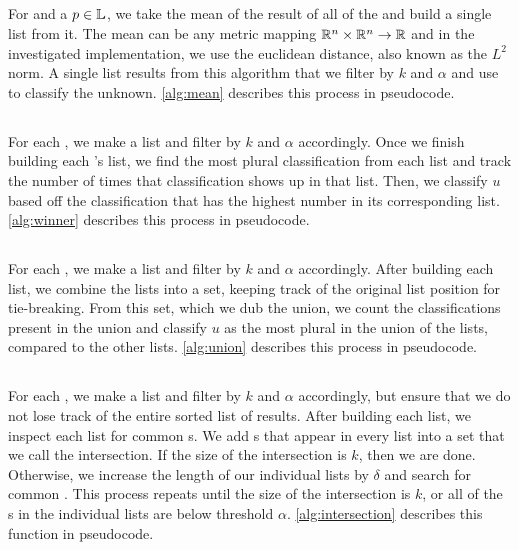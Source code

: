 \subsection{\rmean{}}
For \UNKNOWN{} and a $p\in\mathbb{L}{}$, we take the mean of the result of all of the \compfuncs{} and build a single \knnlong{} list from it.
The mean can be any metric mapping $\mathbb{R}^n\times\mathbb{R}^n\rightarrow\mathbb{R}$ and in the investigated implementation, we use the euclidean distance, also known as the $L^2$ norm.
A single \knnlong{} list results from this algorithm that we filter by $k$ and $\alpha$ and use to classify the unknown.
\autoref{alg:mean} describes this process in pseudocode.


\subsection{\rwinner{}}
For each \compfunc{}, we make a \knnlong{} list and filter by $k$ and $\alpha$ accordingly.
Once we finish building each \compfunc{}'s \knnlong{} list, we find the most plural classification from each list and track the number of times that classification shows up in that list.
Then, we classify $u$ based off the classification that has the highest number in its corresponding list.
\autoref{alg:winner} describes this process in pseudocode.


\subsection{\runion{}}
For each \compfunc{}, we make a \knnlong{} list and filter by $k$ and $\alpha$ accordingly.
After building each \knnlong{} list, we combine the lists into a set, keeping track of the original list position for tie-breaking.
From this set, which we dub the union, we count the classifications present in the union and classify $u$ as the most plural in the union of the lists, compared to the other lists.
\autoref{alg:union} describes this process in pseudocode.


\subsection{\rintersect{}}
For each \compfunc{}, we make a \knnlong{} list and filter by $k$ and $\alpha$ accordingly, but ensure that we do not lose track of the entire sorted list of results.
After building each \knnlong{} list, we inspect each list for common \isol{}s.
We add \isol{}s that appear in every list into a set that we call the intersection.
If the size of the intersection is $k$, then we are done.
Otherwise, we increase the length of our individual lists by $\delta$ and search for common \isol{}.
This process repeats until the size of the intersection is $k$, or all of the \isol{}s in the individual lists are below threshold $\alpha$.
\autoref{alg:intersection} describes this function in pseudocode.

